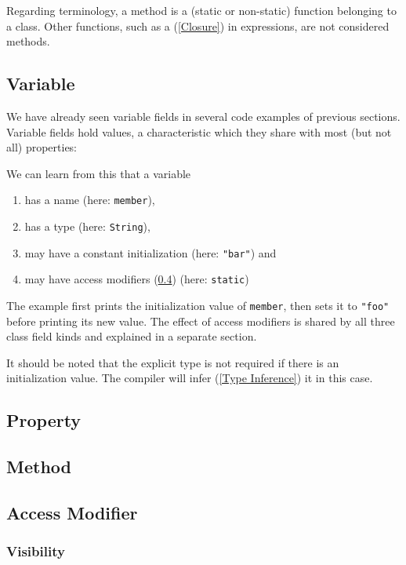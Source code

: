 \documentclass{article}
\newcommand{\type}[1]{\texttt{#1}}
\newcommand{\expr}[1]{\texttt{#1}}
\newcommand{\fullref}[1]{\nameref{#1} (\cref{#1})}
\begin{document}
Regarding terminology, a method is a (static or non-static) function belonging to a class. Other functions, such as a \fullref{Closure} in expressions, are not considered methods.


\subsection{Variable}
\label{Variable}

We have already seen variable fields in several code examples of previous sections. Variable fields hold values, a characteristic which they share with most (but not all) properties:


We can learn from this that a variable

\begin{enumerate}
	\item has a name (here: \expr{member}),
	\item has a type (here: \type{String}),
	\item may have a constant initialization (here: \expr{"bar"}) and
	\item may have access modifiers (\cref{Access Modifier}) (here: \expr{static})
\end{enumerate}
The example first prints the initialization value of \expr{member}, then sets it to \expr{"foo"} before printing its new value. The effect of access modifiers is shared by all three class field kinds and explained in a separate section.

It should be noted that the explicit type is not required if there is an initialization value. The compiler will infer (\cref{Type Inference}) it in this case.

\subsection{Property}
\label{Property}



\subsection{Method}
\label{Method}


\subsection{Access Modifier}
\label{Access Modifier}

\subsubsection{Visibility}
\label{Visibility}
\end{document}
